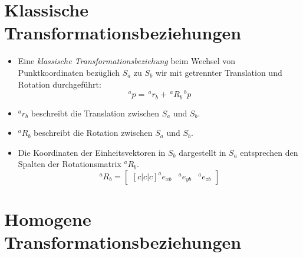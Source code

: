     \section{Klassische Transformationsbeziehungen} %
        \begin{itemize}
        	\item Eine \textit{klassische Transformationsbeziehung} beim Wechsel von Punktkoordinaten bezüglich \( S _ a \) zu \( S _ b \) wir mit getrennter Translation und Rotation durchgeführt:
	            \begin{equation*}
		            ^ap = \,^ar_b + \,^aR_b \,^bp
	            \end{equation*}
	        \item \( ^ar_b \) beschreibt die Translation zwischen \( S _ a \) und \( S _ b \).
	        \item \( ^aR_b \) beschreibt die Rotation zwischen \( S _ a \) und \( S _ b \).
	        \item Die Koordinaten der Einheitsvektoren in \( S _ b \) dargestellt in \( S _ a \) entsprechen den Spalten der Rotationsmatrix \( ^aR_b \).
		        \begin{equation*}
			        ^aR_b =
			        \begin{bmatrix}[c|c|c]
				        ^ae_{xb} & ^ae_{yb} & ^ae_{zb}
			        \end{bmatrix}
		        \end{equation*}
        \end{itemize}

    \section{Homogene Transformationsbeziehungen} %
        \label{sec:homogeneMatrix}
    
